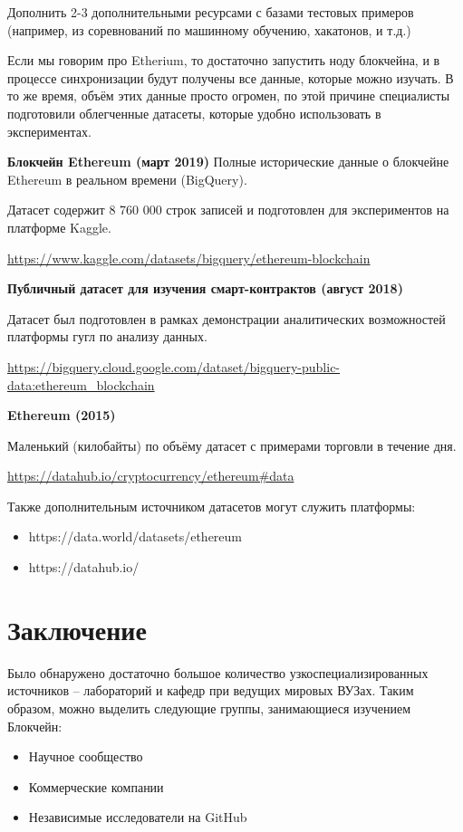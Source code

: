 \documentclass[a4paper, 12pt]{report}		%
\begin{document}
Дополнить 2-3 дополнительными ресурсами с базами тестовых примеров (например, из соревнований по машинному обучению, хакатонов, и т.д.)

Если мы говорим про Etherium, то достаточно запустить ноду блокчейна, и в процессе синхронизации будут получены все данные, которые можно изучать. В то же время, объём этих данные просто огромен, по этой причине специалисты подготовили облегченные датасеты, которые удобно использовать в экспериментах.

\textbf{Блокчейн Ethereum (март 2019)}
Полные исторические данные о блокчейне Ethereum в реальном времени (BigQuery).

Датасет содержит 8 760 000 строк записей и подготовлен для экспериментов на платформе Kaggle.

\url{https://www.kaggle.com/datasets/bigquery/ethereum-blockchain}

\textbf{Публичный датасет для изучения смарт-контрактов (август 2018)}

Датасет был подготовлен в рамках демонстрации аналитических возможностей платформы гугл по анализу данных.

\url{https://bigquery.cloud.google.com/dataset/bigquery-public-data:ethereum_blockchain}

\textbf{Ethereum (2015)}

Маленький (килобайты) по объёму датасет с примерами торговли в течение дня.

\url{https://datahub.io/cryptocurrency/ethereum#data}

Также дополнительным источником датасетов могут служить платформы:
\begin{itemize}
\item https://data.world/datasets/ethereum
\item https://datahub.io/
\end{itemize}

\chapter*{Заключение}

Было обнаружено достаточно большое количество узкоспециализированных источников -- лабораторий и кафедр при ведущих мировых ВУЗах. Таким образом, можно выделить следующие группы, занимающиеся изучением Блокчейн:
\begin{itemize}
\item Научное сообщество
\item Коммерческие компании
\item Независимые исследователи на GitHub
\end{itemize}
\end{document}
